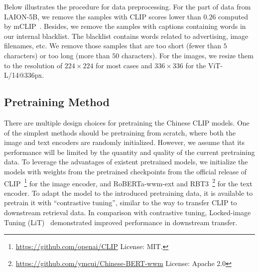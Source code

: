 \documentclass[11pt]{article}
\begin{document}
Below illustrates the procedure for data preprocessing. 
For the part of data from LAION-5B, we remove the samples with CLIP scores lower than $0.26$ computed by mCLIP~\citep{mclip}. 
Besides, we remove the samples with captions containing words in our internal blacklist. 
The blacklist contains words related to advertising, image filenames, etc. 
We remove those samples that are too short (fewer than $5$ characters) or too long (more than $50$ characters). 
For the images, we resize them to the resolution of $224 \times 224$ for most cases and $336 \times 336$ for the ViT-L/14@336px. 

\subsection{Pretraining Method}
\label{subsec:pretraining_method}

There are multiple design choices for pretraining the Chinese CLIP models. 
One of the simplest methods should be pretraining from scratch, where both the image and text encoders are randomly initialized. 
However, we assume that its performance will be limited by the quantity and quality of the current pretraining data. 
To leverage the advantages of existent pretrained models, we initialize the models with weights from the pretrained checkpoints from the official release of CLIP~\footnote{\url{https://github.com/openai/CLIP} License: MIT.} for the image encoder, and RoBERTa-wwm-ext and RBT3~\footnote{\url{https://github.com/ymcui/Chinese-BERT-wwm} License: Apache 2.0} for the text encoder. 
To adapt the model to the introduced pretraining data, it is available to pretrain it with ``contrastive tuning'', similar to the way to transfer CLIP to downstream retrieval data. 
In comparison with contrastive tuning, Locked-image Tuning (LiT)~\citep{lit} demonstrated improved performance in downstream transfer. 
\end{document}
